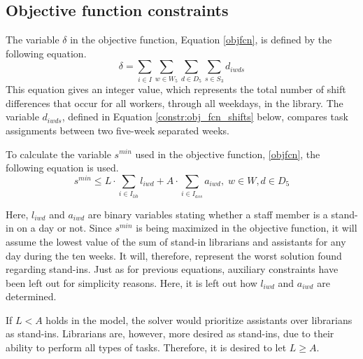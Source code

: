 \subsection{Objective function constraints} \label{section:obj_fcn_constraints}
The variable $\delta$ in the objective function, Equation \ref{objfcn}, is defined by the following equation.
\begin{equation} \label{constr:delta}
\delta = \sum_{i \in I} \sum_{w \in W_5} \sum_{d \in D_5} \sum_{s \in S_3} d_{iwds}
\end{equation}
This equation gives an integer value, which represents the total number of shift differences that occur for all workers, through all weekdays, in the library. The variable $d_{iwds}$, defined in Equation \ref{constr:obj_fcn_shifts} below, compares task assignments between two five-week separated weeks.

To calculate the variable $s^{min}$ used in the objective function, \ref{objfcn}, the following equation is used.
\begin{equation} \label{constr:s_min}
s^{min} \leq L\cdot \sum_{i \in I_{lib}} l_{iwd} + A\cdot \sum_{i \in I_{ass}} a_{iwd}, \;   w \in W, d \in D_5
\end{equation}

Here, $l_{iwd}$ and $a_{iwd}$ are binary variables stating whether a staff member is a stand-in on a day or not. Since $s^{min}$ is being maximized in the objective function, it will assume the lowest value of the sum of stand-in librarians and assistants for any day during the ten weeks. It will, therefore, represent the worst solution found regarding stand-ins. Just as for previous equations, auxiliary constraints have been left out for simplicity reasons. Here, it is left out how $l_{iwd}$ and $a_{iwd}$ are determined.

If $L < A$ holds in the model, the solver would prioritize assistants over librarians as stand-ins. Librarians are, however, more desired as stand-ins, due to their ability to perform all types of tasks. Therefore, it is desired to let $L \geq A$.

